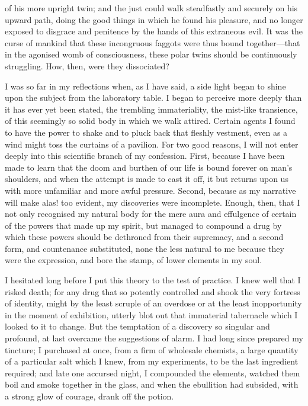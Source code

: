\documentclass[]{novel}
\begin{document}
of his more upright twin; and the just could walk steadfastly and securely on his upward path, doing the good things in which he found his pleasure, and no longer exposed to disgrace and penitence by the hands of this extraneous evil. It was the curse of mankind that these incongruous faggots were thus bound together—that in the agonised womb of consciousness, these polar twins should be continuously struggling. How, then, were they dissociated?

I was so far in my reflections when, as I have said, a side light began to shine upon the subject from the laboratory table. I began to perceive more deeply than it has ever yet been stated, the trembling immateriality, the mist-like transience, of this seemingly so solid body in which we walk attired. Certain agents I found to have the power to shake and to pluck back that fleshly vestment, even as a wind might toss the curtains of a pavilion. For two good reasons, I will not enter deeply into this scientific branch of my confession. First, because I have been made to learn that the doom and burthen of our life is bound forever on man's shoulders, and when the attempt is made to cast it off, it but returns upon us with more unfamiliar and more awful pressure. Second, because as my narrative will make alas! too evident, my discoveries were incomplete. Enough, then, that I not only recognised my natural body for the mere aura and effulgence of certain of the powers that made up my spirit, but managed to compound a drug by which these powers should be dethroned from their supremacy, and a second form, and countenance substituted, none the less natural to me because they were the expression, and bore the stamp, of lower elements in my soul.

I hesitated long before I put this theory to the test of practice. I knew well that I risked death; for any drug that so potently controlled and shook the very fortress of identity, might by the least scruple of an overdose or at the least inopportunity in the moment of exhibition, utterly blot out that immaterial tabernacle which I looked to it to change. But the temptation of a discovery so singular and profound, at last overcame the suggestions of alarm. I had long since prepared my tincture; I purchased at once, from a firm of wholesale chemists, a large quantity of a particular salt which I knew, from my experiments, to be the last ingredient required; and late one accursed night, I compounded the elements, watched them boil and smoke together in the glass, and when the ebullition had subsided, with a strong glow of courage, drank off the potion.
\end{document}

